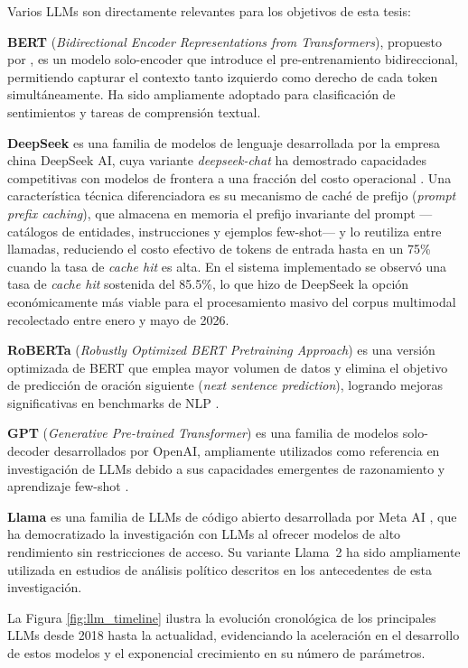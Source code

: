 Varios LLMs son directamente relevantes para los objetivos de esta tesis:

\textbf{BERT} (\textit{Bidirectional Encoder Representations from Transformers}), propuesto por \cite{tec_devlin2018bert}, es un modelo solo-encoder que introduce el pre-entrenamiento bidireccional, permitiendo capturar el contexto tanto izquierdo como derecho de cada token simultáneamente. Ha sido ampliamente adoptado para clasificación de sentimientos y tareas de comprensión textual.

\textbf{DeepSeek} es una familia de modelos de lenguaje desarrollada por la empresa china DeepSeek AI, cuya variante \textit{deepseek-chat} ha demostrado capacidades competitivas con modelos de frontera a una fracción del costo operacional \parencite{tec_deepseek2024}. Una característica técnica diferenciadora es su mecanismo de caché de prefijo (\textit{prompt prefix caching}), que almacena en memoria el prefijo invariante del prompt —catálogos de entidades, instrucciones y ejemplos few-shot— y lo reutiliza entre llamadas, reduciendo el costo efectivo de tokens de entrada hasta en un 75\% cuando la tasa de \textit{cache hit} es alta. En el sistema implementado se observó una tasa de \textit{cache hit} sostenida del 85.5\%, lo que hizo de DeepSeek la opción económicamente más viable para el procesamiento masivo del corpus multimodal recolectado entre enero y mayo de 2026.

\textbf{RoBERTa} (\textit{Robustly Optimized BERT Pretraining Approach}) es una versión optimizada de BERT que emplea mayor volumen de datos y elimina el objetivo de predicción de oración siguiente (\textit{next sentence prediction}), logrando mejoras significativas en benchmarks de NLP \parencite{tec_liu2019roberta}.

\textbf{GPT} (\textit{Generative Pre-trained Transformer}) es una familia de modelos solo-decoder desarrollados por OpenAI, ampliamente utilizados como referencia en investigación de LLMs debido a sus capacidades emergentes de razonamiento y aprendizaje few-shot \parencite{tec_brown2020gpt3}.

\textbf{Llama} es una familia de LLMs de código abierto desarrollada por Meta AI \parencite{tec_touvron2023llama}, que ha democratizado la investigación con LLMs al ofrecer modelos de alto rendimiento sin restricciones de acceso. Su variante Llama~2 ha sido ampliamente utilizada en estudios de análisis político descritos en los antecedentes de esta investigación.

La Figura \ref{fig:llm_timeline} ilustra la evolución cronológica de los principales LLMs desde 2018 hasta la actualidad, evidenciando la aceleración en el desarrollo de estos modelos y el exponencial crecimiento en su número de parámetros.

